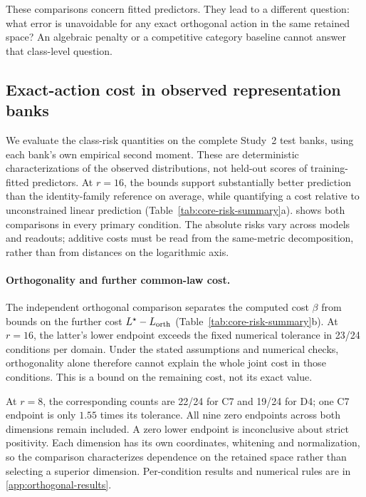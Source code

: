 These comparisons concern fitted predictors. They lead to a different question: what error is unavoidable for any exact orthogonal action in the same retained space? An algebraic penalty or a competitive category baseline cannot answer that class-level question.

\subsection{Exact-action cost in observed representation banks}
\label{sec:observed-risk}


We evaluate the class-risk quantities on the complete Study~2 test banks, using each bank's own empirical second moment. These are deterministic characterizations of the observed distributions, not held-out scores of training-fitted predictors. At $r=16$, the bounds support substantially better prediction than the identity-family reference on average, while quantifying a cost relative to unconstrained linear prediction (Table~\ref{tab:core-risk-summary}a).  shows both comparisons in every primary condition. The absolute risks vary across models and readouts; additive costs must be read from the same-metric decomposition, rather than from distances on the logarithmic axis.

\paragraph{Orthogonality and further common-law cost.}
\label{par:orthogonal-results}
The independent orthogonal comparison separates the computed cost $\beta$ from bounds on the further cost $L^\star-L_{\rm orth}$ (Table~\ref{tab:core-risk-summary}b). At $r=16$, the latter's lower endpoint exceeds the fixed numerical tolerance in 23/24 conditions per domain. Under the stated assumptions and numerical checks, orthogonality alone therefore cannot explain the whole joint cost in those conditions. This is a bound on the remaining cost, not its exact value.

At $r=8$, the corresponding counts are 22/24 for C7 and 19/24 for D4; one C7 endpoint is only $1.55$ times its tolerance. All nine zero endpoints across both dimensions remain included. A zero lower endpoint is inconclusive about strict positivity. Each dimension has its own coordinates, whitening and normalization, so the comparison characterizes dependence on the retained space rather than selecting a superior dimension. Per-condition results and numerical rules are in \cref{app:orthogonal-results}.

